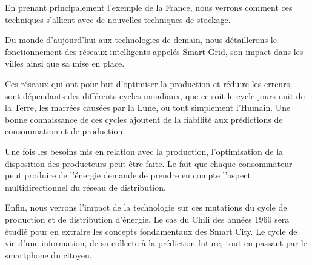 En prenant principalement l'exemple de la France, nous verrons comment ces techniques s'allient avec
de nouvelles techniques de stockage.

Du monde d'aujourd'hui aux technologies de demain, nous détaillerons le fonctionnement des réseaux intelligents
appelés Smart Grid, son impact dans les villes ainsi que sa mise en place.

Ces réseaux qui ont pour but d'optimiser la production et réduire les erreurs, sont dépendants des différents cycles
mondiaux, que ce soit le cycle jours-nuit de la Terre, les marrées causées par la Lune, ou tout simplement l'Humain.
Une bonne connaissance de ces cycles ajoutent de la fiabilité aux prédictions de consommation et de production.

Une fois les besoins mis en relation avec la production, l'optimisation de la disposition
des producteurs peut être faite.
Le fait que chaque consommateur peut produire de l'énergie demande de prendre en compte l'aspect
multidirectionnel du réseau de distribution.

Enfin, nous verrons l'impact de la technologie sur ces mutations du cycle de production et de distribution d'énergie.
Le cas du Chili des années 1960 sera étudié pour en extraire les concepts fondamentaux des Smart City.
Le cycle de vie d'une information, de sa collecte à la prédiction future, tout en passant par le smartphone du citoyen.
